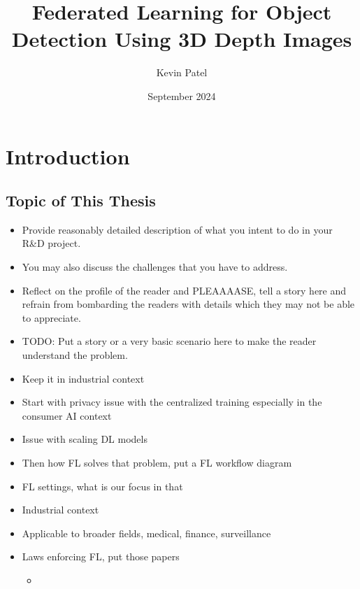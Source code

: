 \documentclass[thesis]{mas_proposal}
\title{Federated Learning for Object Detection Using 3D Depth Images}
\author{Kevin Patel}
\date{September 2024}
\begin{document}
\maketitle

\pagestyle{plain}

\section{Introduction}

\subsection{Topic of This Thesis}
\begin{itemize}
      \item Provide reasonably detailed description of what you intent to do in your R\&D project.
      \item You may also discuss the challenges that you have to address.
      \item Reflect on the profile of the reader and PLEAAAASE, tell a story here and refrain from bombarding the readers with details which they may not be able to appreciate.

      \item TODO: Put a story or a very basic scenario here to make the reader understand the problem.
      \item Keep it in industrial context
      \item Start with privacy issue with the centralized training especially in the consumer AI context
      \item Issue with scaling DL models
      \item Then how FL solves that problem, put a FL workflow diagram
      \item FL settings, what is our focus in that
      \item Industrial context
      \item Applicable to broader fields, medical, finance, surveillance
      \item Laws enforcing FL, put those papers
            \begin{itemize}
                  \item \cite{voigt2017eu}
            \end{itemize}


\end{itemize}
\end{document}
